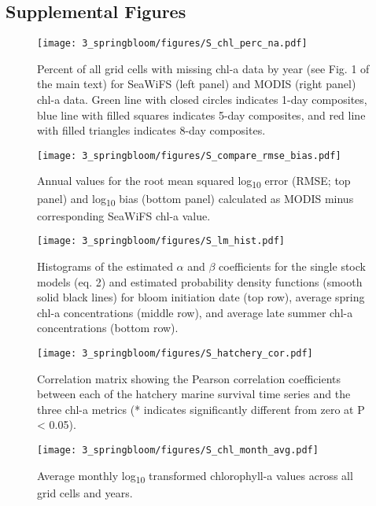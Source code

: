 \subsection{Supplemental Figures}

\begin{figure}[htbp]
  \centering \texttt{[image: 3\_springbloom/figures/S\_chl\_perc\_na.pdf]}
  \caption{Percent of all grid cells with missing chl-a data by year (see Fig. 1
    of the main text) for SeaWiFS (left panel) and MODIS (right panel) chl-a
    data. Green line with closed circles indicates 1-day composites, blue line
    with filled squares indicates 5-day composites, and red line with filled
    triangles indicates 8-day composites.}
  \label{fig:bloom:s1}
\end{figure}


\begin{figure}[htbp]
  \centering
  \texttt{[image: 3\_springbloom/figures/S\_compare\_rmse\_bias.pdf]}
  \caption{Annual values for the root mean squared log\textsubscript{10} error
   (RMSE; top panel) and log\textsubscript{10} bias (bottom panel) calculated
    as MODIS minus corresponding SeaWiFS chl-a value.}
  \label{fig:bloom:s2}
\end{figure}

\begin{figure}[htbp]
  \centering
  \texttt{[image: 3\_springbloom/figures/S\_lm\_hist.pdf]}
  \caption{Histograms of the estimated \(\alpha\) and \(\beta\) coefficients for
    the single stock models (eq. 2) and estimated probability density functions
    (smooth solid black lines) for bloom initiation date (top row), average
    spring chl-a concentrations (middle row), and average late summer chl-a
    concentrations (bottom row).}
  \label{fig:bloom:s3}
\end{figure}

\begin{figure}[htbp]
  \centering
  \texttt{[image: 3\_springbloom/figures/S\_hatchery\_cor.pdf]}
  \caption{Correlation matrix showing the Pearson correlation coefficients
    between each of the hatchery marine survival time series and the three chl-a
    metrics (* indicates significantly different from zero at P \textless{}
    0.05).}
  \label{fig:bloom:s4}
\end{figure}

\begin{figure}[htbp]
  \centering
  \texttt{[image: 3\_springbloom/figures/S\_chl\_month\_avg.pdf]}
  \caption{Average monthly log\textsubscript{10} transformed chlorophyll-a
    values across all grid cells and years.}
  \label{fig:bloom:s5}
\end{figure}



